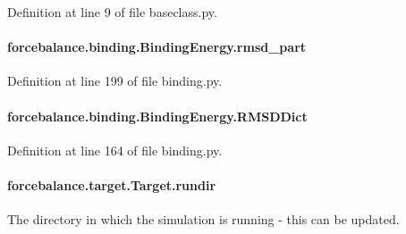 Definition at line 9 of file baseclass.\-py.

\hypertarget{classforcebalance_1_1binding_1_1BindingEnergy_a9503044f7d14bfd9f8dc98dbe7950685}{
\paragraph[{rmsd\-\_\-part}]{\setlength{\rightskip}{0pt plus 5cm}forcebalance.\-binding.\-Binding\-Energy.\-rmsd\-\_\-part}}\label{classforcebalance_1_1binding_1_1BindingEnergy_a9503044f7d14bfd9f8dc98dbe7950685}


Definition at line 199 of file binding.\-py.

\hypertarget{classforcebalance_1_1binding_1_1BindingEnergy_a5f2f2a25d42e1b27f17fa7b289f0dd26}{
\paragraph[{R\-M\-S\-D\-Dict}]{\setlength{\rightskip}{0pt plus 5cm}forcebalance.\-binding.\-Binding\-Energy.\-R\-M\-S\-D\-Dict}}\label{classforcebalance_1_1binding_1_1BindingEnergy_a5f2f2a25d42e1b27f17fa7b289f0dd26}


Definition at line 164 of file binding.\-py.

\hypertarget{classforcebalance_1_1target_1_1Target_a6872de5b2d4273b82336ea5b0da29c9e}{
\paragraph[{rundir}]{\setlength{\rightskip}{0pt plus 5cm}forcebalance.\-target.\-Target.\-rundir\hspace{0.3cm}{\ttfamily [inherited]}}}\label{classforcebalance_1_1target_1_1Target_a6872de5b2d4273b82336ea5b0da29c9e}


The directory in which the simulation is running -\/ this can be updated. 

